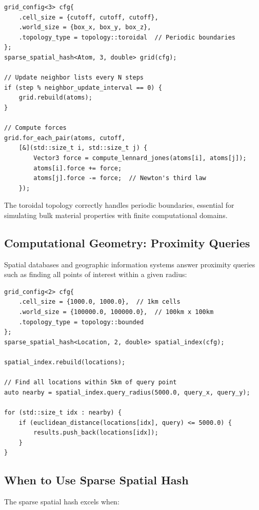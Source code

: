 \documentclass[11pt]{article}
\begin{document}
\begin{lstlisting}[caption={Molecular dynamics neighbor list}]
grid_config<3> cfg{
    .cell_size = {cutoff, cutoff, cutoff},
    .world_size = {box_x, box_y, box_z},
    .topology_type = topology::toroidal  // Periodic boundaries
};
sparse_spatial_hash<Atom, 3, double> grid(cfg);

// Update neighbor lists every N steps
if (step % neighbor_update_interval == 0) {
    grid.rebuild(atoms);
}

// Compute forces
grid.for_each_pair(atoms, cutoff,
    [&](std::size_t i, std::size_t j) {
        Vector3 force = compute_lennard_jones(atoms[i], atoms[j]);
        atoms[i].force += force;
        atoms[j].force -= force;  // Newton's third law
    });
\end{lstlisting}

The toroidal topology correctly handles periodic boundaries, essential for simulating bulk material properties with finite computational domains.

\subsection{Computational Geometry: Proximity Queries}

Spatial databases and geographic information systems answer proximity queries such as finding all points of interest within a given radius:

\begin{lstlisting}[caption={GIS proximity query example}]
grid_config<2> cfg{
    .cell_size = {1000.0, 1000.0},  // 1km cells
    .world_size = {100000.0, 100000.0},  // 100km x 100km
    .topology_type = topology::bounded
};
sparse_spatial_hash<Location, 2, double> spatial_index(cfg);

spatial_index.rebuild(locations);

// Find all locations within 5km of query point
auto nearby = spatial_index.query_radius(5000.0, query_x, query_y);

for (std::size_t idx : nearby) {
    if (euclidean_distance(locations[idx], query) <= 5000.0) {
        results.push_back(locations[idx]);
    }
}
\end{lstlisting}

\subsection{When to Use Sparse Spatial Hash}

The sparse spatial hash excels when:
\end{document}
